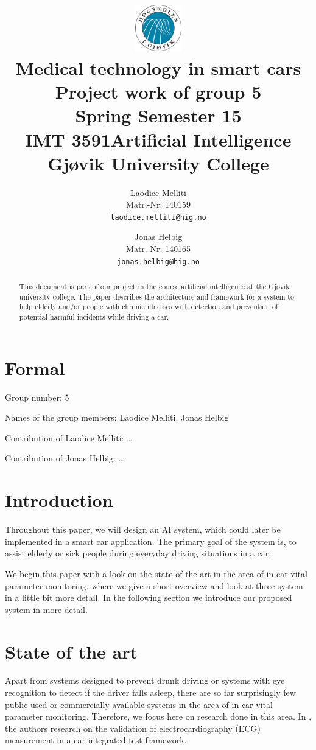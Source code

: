 \documentclass[a4paper]{article}
\title{								%
	\includegraphics[height=2cm]{higlogo}\\\vspace{1cm}	%
	Medical technology in smart cars\\\vspace{7mm}
	\Large{Project work of group 5}\\\vspace{5mm}
	\normalsize{Spring Semester 15}\\\vspace{1cm}
	\large{IMT 3591Artificial Intelligence\\
		Gj\o{}vik University College
		\\\vspace{1cm}}}
\author{			%
Laodice Melliti\\
Matr.-Nr: 140159\\
{\tt laodice.melliti@hig.no}
\and 
Jonas Helbig\\
Matr.-Nr: 140165\\
{\tt jonas.helbig@hig.no}
\vspace{1cm}}
\begin{document}
	
\maketitle				%
\thispagestyle{empty} 	%
\begin{abstract}		%
	\noindent			%
	This document is part of our project in the course artificial intelligence at the Gj\o{}vik university college. The paper describes the architecture and framework for a system to help elderly and/or people with chronic illnesses with detection and prevention of potential harmful incidents while driving a car. 
\end{abstract}

\newpage				%
\tableofcontents		%
\newpage
\section{Formal}
Group number: 5

Names of the group members: Laodice Melliti, Jonas Helbig

Contribution of Laodice Melliti: \dots

Contribution of Jonas Helbig: \dots
\section{Introduction}
Throughout this paper, we will design an AI system, which could later be implemented in a smart car application. The primary goal of the system is, to assist elderly or sick people during everyday driving situations in a car.

We begin this paper with a look on  the state of the art in the area of in-car vital parameter monitoring, where we give a short overview and look at three system in a little bit more detail. In the following section we introduce our proposed system in more detail.
\section{State of the art}
Apart from systems designed to prevent drunk driving or systems with eye recognition to detect if the driver falls asleep, there are so far surprisingly few public used or commercially available systems in the area of in-car vital parameter monitoring. Therefore, we focus here on research done in this area. In \cite{schneider:12}, the authors research on the validation of electrocardiography (ECG) measurement in a car-integrated test framework.
\end{document}
